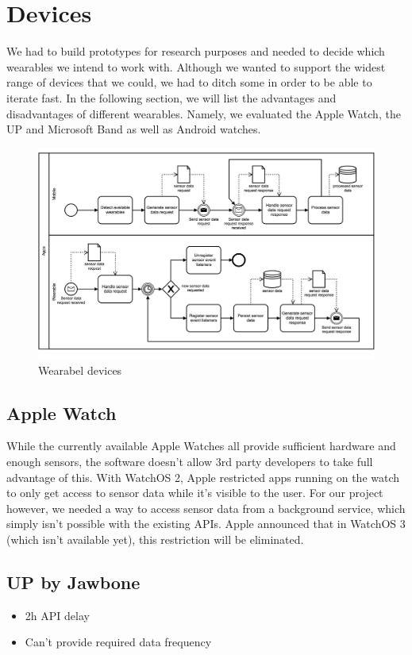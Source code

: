 \section{Devices}
\label{sec:devices}

We had to build prototypes for research purposes and needed to decide which wearables we intend to work with.
Although we wanted to support the widest range of devices that we could, we had to ditch some in order to be able to iterate fast.
In the following section, we will list the advantages and disadvantages of different wearables.
Namely, we evaluated the Apple Watch, the UP and Microsoft Band as well as Android watches.

\begin{figure}[H]
	\includegraphics[width=\linewidth]{diagrams/apps.png}
	\caption[Caption for bpmn]{Wearabel devices}
	\label{fig:devices}
\end{figure}

\subsection{Apple Watch}
While the currently available Apple Watches all provide sufficient hardware and enough sensors, the software doesn't allow 3rd party developers to take full advantage of this.
With WatchOS 2, Apple restricted apps running on the watch to only get access to sensor data while it's visible to the user.
For our project however, we needed a way to access sensor data from a background service, which simply isn't possible with the existing APIs.
Apple announced that in WatchOS 3 (which isn't available yet), this restriction will be eliminated. 

\subsection{UP by Jawbone}
\begin{itemize}[noitemsep]
	\item 2h API delay
	\item Can't provide required data frequency
\end{itemize}

